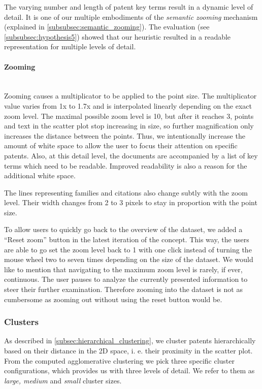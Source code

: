 The varying number and length of patent key terms result in a dynamic level of detail.
It is one of our multiple embodiments of the \textit{semantic zooming} mechanism (explained in \autoref{subsubsec:semantic_zooming}).
The evaluation (see \autoref{subsubsec:hypothesis5}) showed that our heuristic resulted in a readable representation for multiple levels of detail.

\paragraph{Zooming}~\\
Zooming causes a multiplicator to be applied to the point size.
The multiplicator value varies from 1x to 1.7x and is interpolated linearly depending on the exact zoom level.
The maximal possible zoom level is 10, but after it reaches 3, points and text in the scatter plot stop increasing in size, so further magnification only increases the distance between the points.
Thus, we intentionally increase the amount of white space to allow the user to focus their attention on specific patents.
Also, at this detail level, the documents are accompanied by a list of key terms which need to be readable.
Improved readability is also a reason for the additional white space.

The lines representing families and citations also change subtly with the zoom level.
Their width changes from 2 to 3 pixels to stay in proportion with the point size.

To allow users to quickly go back to the overview of the dataset, we added a ``Reset zoom'' button in the latest iteration of the concept.
This way, the users are able to go set the zoom level back to 1 with one click instead of turning the mouse wheel two to seven times depending on the size of the dataset.
We would like to mention that navigating to the maximum zoom level is rarely, if ever, continuous.
The user pauses to analyze the currently presented information to steer their further examination.
Therefore zooming into the dataset is not as cumbersome as zooming out without using the reset button would be.

\subsubsection{Clusters}
\label{subsubsec:clusters}
As described in \autoref{subsec:hierarchical_clustering}, we cluster patents hierarchically based on their distance in the 2D space, i. e. their proximity in the scatter plot.
From the computed agglomerative clustering we pick three specific cluster configurations, which provides us with three levels of detail.
We refer to them as \textit{large, medium} and \textit{small} cluster sizes.

